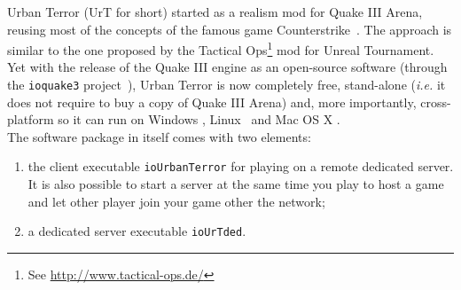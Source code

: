 %  
%
%
%
%

Urban Terror (UrT for short) started as a realism mod for Quake III Arena,
reusing most of the concepts of the famous game Counterstrike~\cite{cs}.
The approach is similar to the one proposed by the Tactical Ops\footnote{See
\url{http://www.tactical-ops.de/}} mod for Unreal Tournament.
Yet with the release of the Quake III engine as an open-source software (through
the \texttt{ioquake3} project~\cite{ioq3}), Urban Terror is now completely free,
stand-alone (\emph{i.e.} it does not require to buy a copy of Quake III Arena)
and, more importantly, cross-platform so it can run on Windows \windows, Linux
\linux\ and Mac OS X \macosx.    
\\
The software package in itself comes with two elements: 
\begin{enumerate}\setitemsep
\item the client executable \texttt{ioUrbanTerror} for playing on a remote
  dedicated server. It is also possible to start a server at the same time you
  play to host a game and let other player join your game other the network;
\item a dedicated server executable \texttt{ioUrTded}.
\end{enumerate}

